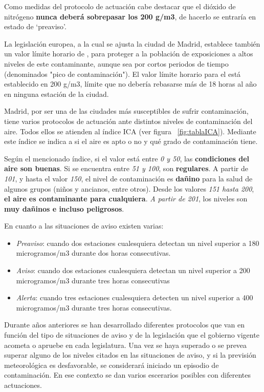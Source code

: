  Como medidas del protocolo de actuación cabe destacar que el dióxido de nitrógeno  \textbf{nunca deberá sobrepasar los 200 \textmugreek g/m3}, de hacerlo se entraría en estado de ‘preaviso’.
 
 La legislación europea, a la cual se ajusta la ciudad de Madrid, establece también un valor límite horario de , para proteger a la población de exposiciones a altos niveles de este contaminante, aunque sea por cortos periodos de tiempo (denominados "pico de contaminación"). El valor límite horario para el  está establecido en 200 \textmugreek g/m3, límite que no debería rebasarse más de 18 horas al año en ninguna estación de la ciudad.
 
    Madrid, por ser una de las ciudades más susceptibles de sufrir contaminación, tiene varios protocolos de actuación ante distintos niveles de contaminación del aire. Todos ellos se atienden al índice ICA (ver figura ~\ref{fig:tablaICA}). Mediante este índice se indica a si el aire es apto o no y qué grado de contaminación tiene. 
  
 Según el mencionado índice, si el valor está entre \textit{0 y 50}, las \textbf{condiciones del aire son buenas}. Si se encuentra entre \textit{51 y 100}, son \textbf{regulares}. A partir de \textit{101}, y hasta el valor \textit{150}, el nivel de contaminación es \textbf{dañino} para la salud de algunos grupos (niños y ancianos, entre otros). Desde los valores \textit{151 hasta 200}, \textbf{el aire es contaminante para cualquiera}. \textit{A partir de 201}, los niveles son \textbf{muy dañinos e incluso peligrosos}.

En cuanto a las  situaciones de aviso existen varias: 
\begin{itemize}
	\item \textit{Preaviso}: cuando dos estaciones cualesquiera detectan un nivel superior a 180 microgramos/m3 durante dos horas consecutivas.
	\item \textit{Aviso}: cuando dos estaciones cualesquiera detectan un nivel superior a 200 microgramos/m3 durante tres horas consecutivas
	\item \textit{Alerta}: cuando tres estaciones cualesquiera detecten un nivel superior a 400 microgramos/m3 durante tres horas consecutivas.
\end{itemize}

Durante años anteriores se han desarrollado diferentes protocolos que van en función del tipo de situaciones de aviso y de la legislación que el gobierno vigente acometa o apruebe en cada legislatura. Una vez se haya superado o se prevea superar alguno de los niveles citados en las situaciones de aviso, y si la previsión meteorológica es desfavorable, se considerará iniciado un episodio de contaminación. En ese contexto se dan varios escerarios posibles con diferentes actuaciones.


